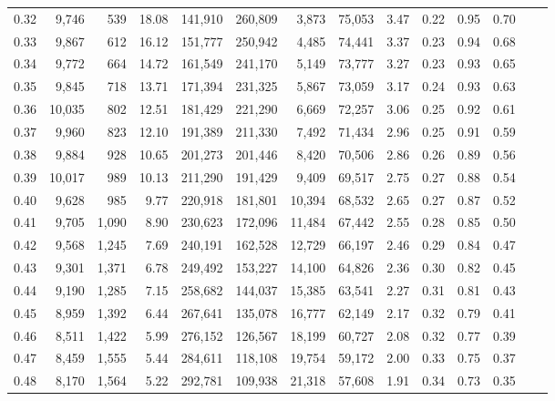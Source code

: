 \begin{tabular}{rrrrrrrrrrrrrr}
0.32 &   9,746 &    539 &   18.08 &  141,910 &  260,809 &   3,873 &  75,053 &  3.47 &  0.22 &  0.95 &      0.70 \\
0.33 &   9,867 &    612 &   16.12 &  151,777 &  250,942 &   4,485 &  74,441 &  3.37 &  0.23 &  0.94 &      0.68 \\
0.34 &   9,772 &    664 &   14.72 &  161,549 &  241,170 &   5,149 &  73,777 &  3.27 &  0.23 &  0.93 &      0.65 \\
0.35 &   9,845 &    718 &   13.71 &  171,394 &  231,325 &   5,867 &  73,059 &  3.17 &  0.24 &  0.93 &      0.63 \\
0.36 &  10,035 &    802 &   12.51 &  181,429 &  221,290 &   6,669 &  72,257 &  3.06 &  0.25 &  0.92 &      0.61 \\
0.37 &   9,960 &    823 &   12.10 &  191,389 &  211,330 &   7,492 &  71,434 &  2.96 &  0.25 &  0.91 &      0.59 \\
0.38 &   9,884 &    928 &   10.65 &  201,273 &  201,446 &   8,420 &  70,506 &  2.86 &  0.26 &  0.89 &      0.56 \\
0.39 &  10,017 &    989 &   10.13 &  211,290 &  191,429 &   9,409 &  69,517 &  2.75 &  0.27 &  0.88 &      0.54 \\
0.40 &   9,628 &    985 &    9.77 &  220,918 &  181,801 &  10,394 &  68,532 &  2.65 &  0.27 &  0.87 &      0.52 \\
0.41 &   9,705 &  1,090 &    8.90 &  230,623 &  172,096 &  11,484 &  67,442 &  2.55 &  0.28 &  0.85 &      0.50 \\
0.42 &   9,568 &  1,245 &    7.69 &  240,191 &  162,528 &  12,729 &  66,197 &  2.46 &  0.29 &  0.84 &      0.47 \\
0.43 &   9,301 &  1,371 &    6.78 &  249,492 &  153,227 &  14,100 &  64,826 &  2.36 &  0.30 &  0.82 &      0.45 \\
0.44 &   9,190 &  1,285 &    7.15 &  258,682 &  144,037 &  15,385 &  63,541 &  2.27 &  0.31 &  0.81 &      0.43 \\
0.45 &   8,959 &  1,392 &    6.44 &  267,641 &  135,078 &  16,777 &  62,149 &  2.17 &  0.32 &  0.79 &      0.41 \\
0.46 &   8,511 &  1,422 &    5.99 &  276,152 &  126,567 &  18,199 &  60,727 &  2.08 &  0.32 &  0.77 &      0.39 \\
0.47 &   8,459 &  1,555 &    5.44 &  284,611 &  118,108 &  19,754 &  59,172 &  2.00 &  0.33 &  0.75 &      0.37 \\
0.48 &   8,170 &  1,564 &    5.22 &  292,781 &  109,938 &  21,318 &  57,608 &  1.91 &  0.34 &  0.73 &      0.35 \\

\end{tabular}
